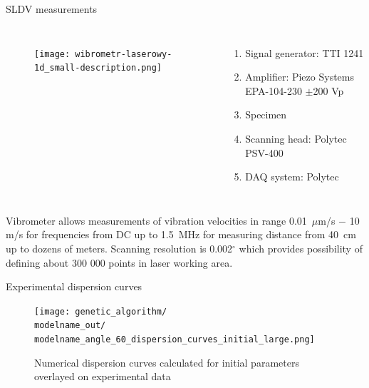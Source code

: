 \documentclass[10pt]{beamer} %
\begin{document}
\begin{frame}[t,label=frame14]{SLDV measurements}
\begin{columns}[T]
	\begin{figure}
	\texttt{[image: wibrometr-laserowy-1d\_small-description.png]}
	\end{figure}
	\begin{enumerate}
	\item Signal generator: TTI 1241 
	\item Amplifier: Piezo Systems EPA-104-230 $\pm$200 Vp
	\item Specimen
	\item Scanning head: Polytec PSV-400
	\item DAQ system: Polytec
	\end{enumerate}
\end{columns}
{\small
 Vibrometer allows measurements of vibration velocities in range 0.01~$\mu$m/s $-$ 10 m/s for frequencies from DC up to 1.5~MHz for measuring distance from 40~cm up to dozens of meters. Scanning resolution is 0.002$^{\circ}$  which provides possibility of defining about 300 000 points in laser working area.}\end{frame}
\begin{frame}[t,label=frame15]{Experimental dispersion curves}
\begin{figure} [h!]
	\newcommand{\modelname}{ga_plain_weave_known_mass}
	\centering
		\texttt{[image: genetic\_algorithm/\\modelname\_out/\\modelname\_angle\_60\_dispersion\_curves\_initial\_large.png]}
		\caption{Numerical dispersion curves calculated for initial parameters overlayed on experimental data}
		\label{fig:dispersion60deg_initial}
\end{figure}
\end{frame}
\end{document}

